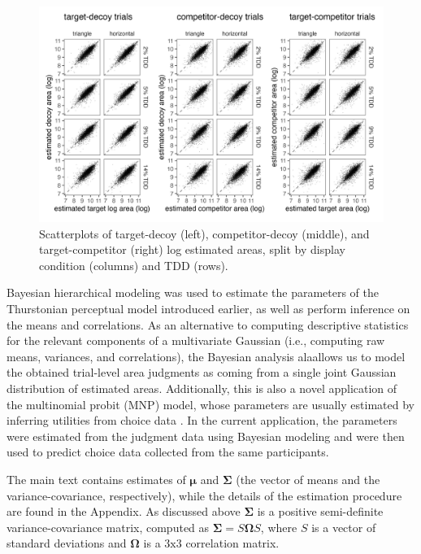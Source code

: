 \begin{figure}
   \includegraphics[width=\textwidth]{figures/circleAreaPhase_cor_plot_all_no_outliers.jpg}
   \caption{Scatterplots of target-decoy (left), competitor-decoy (middle), and target-competitor (right) log estimated areas, split by display condition (columns) and TDD (rows).}
   \label{fig:raw_cors}
\end{figure}

Bayesian hierarchical modeling was used to estimate the parameters of the Thurstonian perceptual model introduced earlier, as well as perform inference on the means and correlations.  As an alternative to computing descriptive statistics for the relevant components of a multivariate Gaussian (i.e., computing raw means, variances, and correlations), the Bayesian analysis alaallows us to model the obtained trial-level area judgments as coming from a single joint Gaussian distribution of estimated areas.  Additionally, this is also a novel application of the multinomial probit (MNP) model, whose parameters are usually estimated by inferring utilities from choice data \parencite{train2009discrete}. In the current application, the parameters were estimated from the judgment data using Bayesian modeling and were then used to predict choice data collected from the same participants. 

The main text contains estimates of $\boldsymbol{\mu}$ and $\boldsymbol{\Sigma}$ (the vector of means and the variance-covariance, respectively), while the details of the estimation procedure are found in the Appendix. As discussed above $\boldsymbol{\Sigma}$ is a positive semi-definite variance-covariance matrix, computed as $\boldsymbol{\Sigma}=S\boldsymbol{\Omega}S$, where $S$ is a vector of standard deviations and $\boldsymbol{\Omega}$ is a $3\text{x}3$ correlation matrix. 

